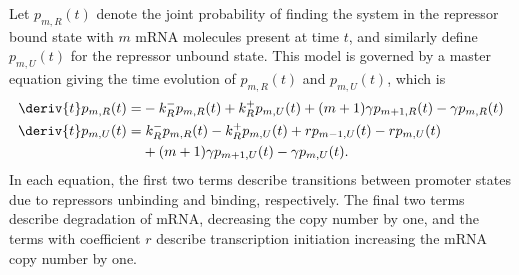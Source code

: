Let $p_{m,R}(t)$ denote the joint probability of finding the system in the
repressor bound state with $m$ mRNA molecules present at time $t$, and similarly
define $p_{m,U}(t)$ for the repressor unbound state. This model is governed by a
master equation giving the time evolution of $p_{m,R}(t)$ and $p_{m,U}(t)$,
which is
\begin{align}
\begin{split}
\deriv{t}p_{m,R}(t) =& - k_R^- p_{m,R}(t) + k_R^+ p_{m,U}(t)
                + (m+1)\gamma p_{m+1,R}(t) - \gamma p_{m,R}(t)
\\
\deriv{t}p_{m,U}(t) =&\; k_R^- p_{m,R}(t) - k_R^+ p_{m,U}(t)
                        + rp_{m-1,U}(t) - rp_{m,U}(t)
                \\
                &+ (m+1)\gamma p_{m+1,U}(t) - \gamma p_{m,U}(t).
\label{eq:poisson_promoter_cme}
\end{split}
\end{align}
In each equation, the first two terms describe transitions between promoter
states due to repressors unbinding and binding, respectively. The final two
terms describe degradation of mRNA, decreasing the copy number by one, and the
terms with coefficient $r$ describe transcription initiation increasing the mRNA
copy number by one.


